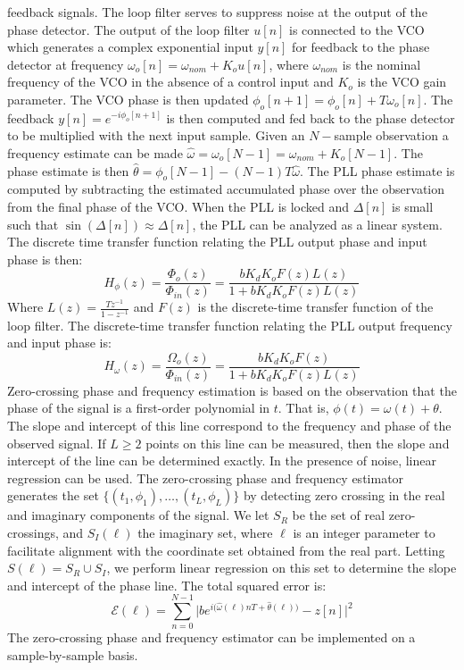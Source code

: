 \documentclass[oneside]{book}
\theoremstyle{mystyle}
\begin{document}
feedback signals. The loop filter serves to suppress noise at the output of the phase detector. The output of the loop filter $u[n]$ is connected to the VCO which generates a complex exponential input $y[n]$ for feedback to the phase detector at frequency $\omega_{o}[n] = \omega_{nom}+K_{o}u[n]$, where $\omega_{nom}$ is the nominal frequency of the VCO in the absence of a control input and $K_{o}$ is the VCO gain parameter. The VCO phase is then updated $\phi_{o}[n+1] = \phi_{o}[n]+T\omega_{o}[n]$. The feedback $y[n] = e^{-i\phi_{o}[n+1]}$ is then computed and fed back to the phase detector to be multiplied with the next input sample. Given an $N-$sample observation a frequency estimate can be made $\hat{\omega} = \omega_{o}[N-1] = \omega_{nom}+K_{o}[N-1]$. The phase estimate is then $\hat{\theta}=\phi_{o}[N-1]-(N-1)T\hat{\omega}$. The PLL phase estimate is computed by subtracting the estimated accumulated phase over the observation from the final phase of the VCO. When the PLL is locked and $\Delta[n]$ is small such that $\sin(\Delta[n]) \approx \Delta[n]$, the PLL can be analyzed as a linear system. The discrete time transfer function relating the PLL output phase and input phase is then:
\begin{equation}
H_{\phi}(z) = \frac{\Phi_{o}(z)}{\Phi_{in}(z)} = \frac{bK_{d}K_{o}F(z)L(z)}{1+bK_{d}K_{o}F(z)L(z)}
\end{equation}
Where $L(z) = \frac{Tz^{-1}}{1-z^{-1}}$ and $F(z)$ is the discrete-time transfer function of the loop filter. The discrete-time transfer function relating the PLL output frequency and input phase is:
\begin{equation}
H_{\omega}(z) = \frac{\Omega_{o}(z)}{\Phi_{in}(z)} = \frac{bK_{d}K_{o}F(z)}{1+bK_{d}K_{o}F(z)L(z)}
\end{equation}
Zero-crossing phase and frequency estimation is based on the observation that the phase of the signal is a first-order polynomial in $t$. That is, $\phi(t) = \omega(t)+\theta$. The slope and intercept of this line correspond to the frequency and phase of the observed signal. If $L\geq 2$ points on this line can be measured, then the slope and intercept of the line can be determined exactly. In the presence of noise, linear regression can be used. The zero-crossing phase and frequency estimator generates the set $\{(t_1,\phi_1),\hdots, (t_{L},\phi_{L})\}$ by detecting zero crossing in the real and imaginary components of the signal. We let $S_{R}$ be the set of real zero-crossings, and $S_{I}(\ell)$ the imaginary set, where $\ell$ is an integer parameter to facilitate alignment with the coordinate set obtained from the real part. Letting $S(\ell) = S_{R}\cup S_{I}$, we perform linear regression on this set to determine the slope and intercept of the phase line. The total squared error is:
\begin{equation}
\mathcal{E}(\ell) = \sum_{n=0}^{N-1} \bigg|be^{i\big(\hat{\omega}(\ell)nT+\hat{\theta}(\ell)\big)}-z[n]\bigg|^2
\end{equation}
The zero-crossing phase and frequency estimator can be implemented on a sample-by-sample basis. 
\end{document}

